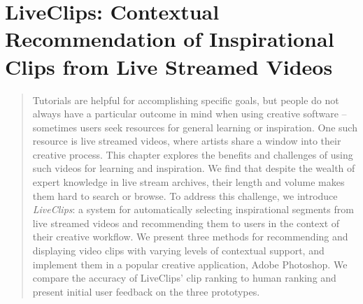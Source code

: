 



\chapter{LiveClips: Contextual Recommendation of Inspirational Clips from Live Streamed Videos}
\label{chapter:liveclips}
\begin{quote}
Tutorials are helpful for accomplishing specific goals, but people do not always have a particular outcome in mind when using creative software -- sometimes users seek resources for general learning or inspiration. One such resource is live streamed videos, where artists share a window into their creative process. This chapter explores the benefits and challenges of using such videos for learning and inspiration.
We find that despite the wealth of expert knowledge in live stream archives, their length and volume makes them hard to search or browse. To address this challenge, we introduce \textit{LiveClips}: a system for automatically selecting inspirational segments from live streamed videos and recommending them to users in the context of their creative workflow. We present three methods for recommending and displaying video clips with varying levels of contextual support, and implement them in a popular creative application, Adobe Photoshop. We compare the accuracy of LiveClips' clip ranking to human ranking and present initial user feedback on the three prototypes.
\end{quote}









